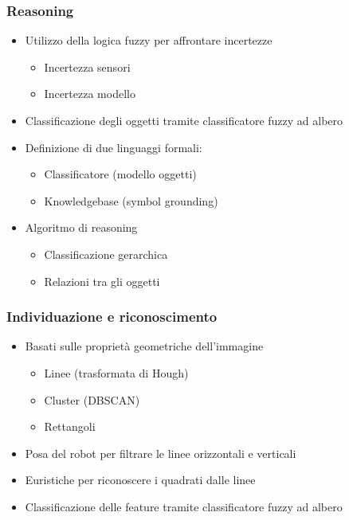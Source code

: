 \documentclass[c]{beamer}
\begin{document}

\begin{frame}
\frametitle{Reasoning}

\begin{itemize}
\item Utilizzo della logica fuzzy per affrontare incertezze
 \begin{itemize}
  \item Incertezza sensori
  \item Incertezza modello
 \end{itemize}
\item Classificazione degli oggetti tramite classificatore fuzzy ad albero

\item Definizione di due linguaggi formali:
 \begin{itemize}
  \item Classificatore (modello oggetti)
  \item Knowledgebase (symbol grounding)
 \end{itemize}

\item Algoritmo di reasoning
 \begin{itemize}
  \item Classificazione gerarchica
  \item Relazioni tra gli oggetti
 \end{itemize}
\end{itemize}



\end{frame}


\begin{frame}
\frametitle{Individuazione e riconoscimento}
\begin{itemize}
 \item Basati sulle proprietà geometriche dell'immagine
 \begin{itemize}
  \item Linee (trasformata di Hough)
  \item Cluster (DBSCAN)
  \item Rettangoli
 \end{itemize}
 \item Posa del robot per filtrare le linee orizzontali e verticali
 \item Euristiche per riconoscere i quadrati dalle linee
 \item Classificazione delle feature tramite classificatore fuzzy ad albero
\end{itemize}

\end{frame}
\end{document}
